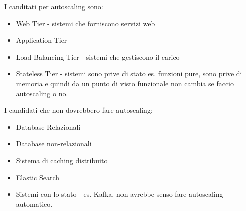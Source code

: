 \documentclass[11pt, twocolumn]{article}
\newenvironment{myitemize}
{ \begin{itemize}[topsep=0ex]
		\setlength{\itemsep}{0pt}
		\setlength{\parskip}{0pt}
		\setlength{\parsep}{0pt}     }
	{ \end{itemize}                  }
\begin{document}
I canditati per autoscaling sono:
\begin{myitemize}
	\item Web Tier - sistemi che forniscono servizi web
	\item Application Tier
	\item Load Balancing Tier - sistemi che gestiscono il carico
	\item Stateless Tier - sistemi sono prive di stato es. funzioni pure, sono prive di memoria e quindi da un punto di visto funzionale non cambia se faccio autoscaling o no.
\end{myitemize}
I candidati che non dovrebbero fare autoscaling:
\begin{myitemize}
	\item Database Relazionali
	\item Database non-relazionali
	\item Sistema di caching distribuito
	\item Elastic Search
	\item Sistemi con lo stato - es. Kafka, non avrebbe senso fare autoscaling automatico.
\end{myitemize}
\end{document}

